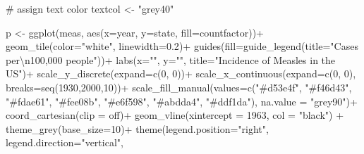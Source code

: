 \documentclass[
  letterpaper,
  DIV=11,
  numbers=noendperiod]{scrreprt}
\newenvironment{Shaded}{\begin{snugshade}}{\end{snugshade}}
\newcommand{\AttributeTok}[1]{\textcolor[rgb]{0.40,0.45,0.13}{#1}}
\newcommand{\CommentTok}[1]{\textcolor[rgb]{0.37,0.37,0.37}{#1}}
\newcommand{\DecValTok}[1]{\textcolor[rgb]{0.68,0.00,0.00}{#1}}
\newcommand{\FloatTok}[1]{\textcolor[rgb]{0.68,0.00,0.00}{#1}}
\newcommand{\FunctionTok}[1]{\textcolor[rgb]{0.28,0.35,0.67}{#1}}
\newcommand{\NormalTok}[1]{\textcolor[rgb]{0.00,0.23,0.31}{#1}}
\newcommand{\OtherTok}[1]{\textcolor[rgb]{0.00,0.23,0.31}{#1}}
\newcommand{\SpecialCharTok}[1]{\textcolor[rgb]{0.37,0.37,0.37}{#1}}
\newcommand{\StringTok}[1]{\textcolor[rgb]{0.13,0.47,0.30}{#1}}
\begin{document}
\begin{Shaded}
\begin{Highlighting}[]
\CommentTok{\# assign text color}
\NormalTok{textcol }\OtherTok{\textless{}{-}} \StringTok{"grey40"}

\NormalTok{p }\OtherTok{\textless{}{-}} \FunctionTok{ggplot}\NormalTok{(meas, }\FunctionTok{aes}\NormalTok{(}\AttributeTok{x=}\NormalTok{year, }\AttributeTok{y=}\NormalTok{state, }\AttributeTok{fill=}\NormalTok{countfactor))}\SpecialCharTok{+}
  \FunctionTok{geom\_tile}\NormalTok{(}\AttributeTok{color=}\StringTok{"white"}\NormalTok{, }\AttributeTok{linewidth=}\FloatTok{0.2}\NormalTok{)}\SpecialCharTok{+}
  \FunctionTok{guides}\NormalTok{(}\AttributeTok{fill=}\FunctionTok{guide\_legend}\NormalTok{(}\AttributeTok{title=}\StringTok{"Cases per}\SpecialCharTok{\textbackslash{}n}\StringTok{100,000 people"}\NormalTok{))}\SpecialCharTok{+}
  \FunctionTok{labs}\NormalTok{(}\AttributeTok{x=}\StringTok{""}\NormalTok{, }\AttributeTok{y=}\StringTok{""}\NormalTok{, }\AttributeTok{title=}\StringTok{"Incidence of Measles in the US"}\NormalTok{)}\SpecialCharTok{+}
  \FunctionTok{scale\_y\_discrete}\NormalTok{(}\AttributeTok{expand=}\FunctionTok{c}\NormalTok{(}\DecValTok{0}\NormalTok{, }\DecValTok{0}\NormalTok{))}\SpecialCharTok{+}
  \FunctionTok{scale\_x\_continuous}\NormalTok{(}\AttributeTok{expand=}\FunctionTok{c}\NormalTok{(}\DecValTok{0}\NormalTok{, }\DecValTok{0}\NormalTok{), }\AttributeTok{breaks=}\FunctionTok{seq}\NormalTok{(}\DecValTok{1930}\NormalTok{,}\DecValTok{2000}\NormalTok{,}\DecValTok{10}\NormalTok{))}\SpecialCharTok{+}
  \FunctionTok{scale\_fill\_manual}\NormalTok{(}\AttributeTok{values=}\FunctionTok{c}\NormalTok{(}\StringTok{"\#d53e4f"}\NormalTok{, }\StringTok{"\#f46d43"}\NormalTok{, }\StringTok{"\#fdae61"}\NormalTok{, }\StringTok{"\#fee08b"}\NormalTok{, }\StringTok{"\#e6f598"}\NormalTok{, }\StringTok{"\#abdda4"}\NormalTok{, }\StringTok{"\#ddf1da"}\NormalTok{), }\AttributeTok{na.value =} \StringTok{"grey90"}\NormalTok{)}\SpecialCharTok{+}
  \FunctionTok{coord\_cartesian}\NormalTok{(}\AttributeTok{clip =} \StringTok{\textquotesingle{}off\textquotesingle{}}\NormalTok{)}\SpecialCharTok{+}
  \FunctionTok{geom\_vline}\NormalTok{(}\AttributeTok{xintercept =} \DecValTok{1963}\NormalTok{, }\AttributeTok{col =} \StringTok{"black"}\NormalTok{) }\SpecialCharTok{+}
  \FunctionTok{theme\_grey}\NormalTok{(}\AttributeTok{base\_size=}\DecValTok{10}\NormalTok{)}\SpecialCharTok{+}
  \FunctionTok{theme}\NormalTok{(}\AttributeTok{legend.position=}\StringTok{"right"}\NormalTok{, }\AttributeTok{legend.direction=}\StringTok{"vertical"}\NormalTok{,}

\end{Highlighting}
\end{Shaded}
\end{document}
